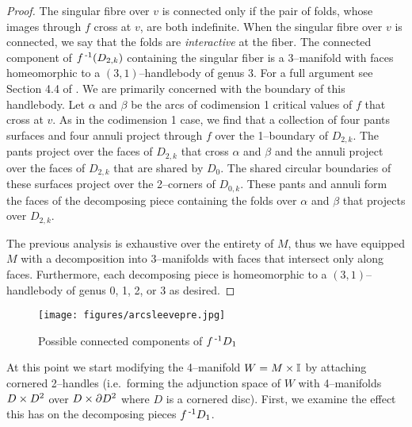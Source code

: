 \begin{proof}
	The singular fibre over $v$ is connected only if the pair of folds, whose images through $f$ cross at $v$, are both indefinite.
	When the singular fibre over $v$ is connected, we say that the folds are \emph{interactive} at the fiber.	
	The connected component of $f^{\,\text{-}1}(D_{2,k})$ containing the singular fiber is a 3--manifold with faces homeomorphic to a $(3,1)$--handlebody of genus 3.
	For a full argument see Section 4.4 of \cite{CostThur08}.
	We are primarily concerned with the boundary of this handlebody.
	Let $\alpha$ and $\beta$ be the arcs of codimension 1 critical values of $f$ that cross at $v$.
	As in the codimension 1 case, we find that a collection of four pants surfaces and four annuli project through $f$ over the 1--boundary of $D_{2,k}$.
	The pants project over the faces of $D_{2,k}$ that cross $\alpha$ and $\beta$ and the annuli project over the faces of $D_{2,k}$ that are shared by $D_0$.
	The shared circular boundaries of these surfaces project over the 2--corners of $D_{0,k}$.
	These pants and annuli form the faces of the decomposing piece containing the folds over $\alpha$ and $\beta$ that projects over $D_{2,k}$.
	
	The previous analysis is exhaustive over the entirety of $M$, thus we have equipped $M$ with a decomposition into 3--manifolds with faces that intersect only along faces.
	Furthermore, each decomposing piece is homeomorphic to a $(3,1)$--handlebody of genus 0, 1, 2, or 3 as desired.
\end{proof}

\begin{figure}
	\centering
	\captionsetup{justification=centering}
	\caption{Possible connected components of  $f^{\,\text{-}1} D_1$}
	\texttt{[image: figures/arcsleevepre.jpg]}
	\label{fig:arcsleevepre}
\end{figure}

At this point we start modifying the 4--manifold $W=M \times \mathbb{I}$ by attaching cornered 2--handles (i.e.\ forming the adjunction space of $W$ with 4--manifolds $D\times D^2$ over $D\times\partial D^2$ where $D$ is a cornered disc).
First, we examine the effect this has on the decomposing pieces $f^{\,\text{-}1} D_1$.

